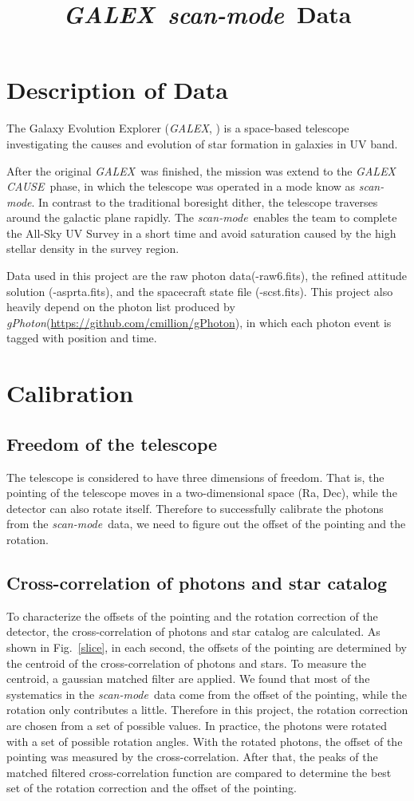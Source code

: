 \documentclass[12pt, preprint]{aastex}
\newcommand{\project}[1]{\textsl{#1}}
\newcommand{\galex}{\project{GALEX}}
\newcommand{\cause}{\project{GALEX CAUSE}}
\newcommand{\scanmode}{\project{scan-mode}}
\newcommand{\gphoton}{\project{gPhoton}}
\begin{document}
\title{\galex\ \scanmode\ Data}
\author{}

\section{Description of Data}
The Galaxy Evolution Explorer (\galex, \citealt{galex}) is a space-based telescope investigating the causes and evolution of star formation in galaxies in UV band.

After the original \galex\ was finished, the mission was extend to the \cause\ phase, in which the telescope was operated in a mode know as \scanmode.
In contrast to the traditional boresight dither, the telescope traverses around the galactic plane rapidly. 
The \scanmode\ enables the team to  complete the All-Sky UV Survey in a short time and avoid saturation caused by the high stellar density in the survey region.

Data used in this project are the raw photon data(-raw6.fits), the refined attitude solution (-asprta.fits), and the spacecraft state file (-scst.fits). 
This project also heavily depend on the photon list produced by \gphoton (\url{https://github.com/cmillion/gPhoton}), in which each photon event is tagged with position and time.

\section{Calibration}

\subsection{Freedom of the telescope}
The telescope is considered to have three dimensions of freedom. 
That is, the pointing of the telescope moves in a two-dimensional space (Ra, Dec), while the detector can also rotate itself. 
Therefore to successfully calibrate the photons from the \scanmode\ data, we need to figure out the offset of the pointing and the rotation.

\subsection{Cross-correlation of photons and star catalog}
To characterize the offsets of the pointing and the rotation correction of the detector, the cross-correlation of photons and star catalog are calculated. 
As shown in Fig.~\ref{slice}, in each second, the offsets of the pointing are determined by the centroid of the cross-correlation of photons and stars. 
To measure the centroid, a gaussian matched filter are applied.
We found that most of the systematics in the \scanmode\ data come from the offset of the pointing, while the rotation only contributes a little.
Therefore in this project, the rotation correction are chosen from a set of possible values. 
In practice, the photons were rotated with a set of possible rotation angles. With the rotated photons, the offset of the pointing was measured by the cross-correlation. After that, the peaks of the matched filtered cross-correlation function are compared to determine the best set of the rotation correction and the offset of the pointing.
\end{document}
